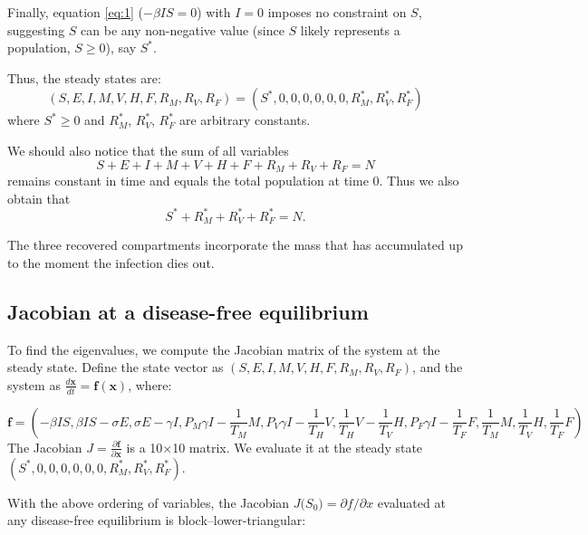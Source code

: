 \documentclass[11pt]{article}
\begin{document}
Finally, equation \ref{eq:1} ($-\beta I S = 0$) with $I = 0$ imposes no constraint on $S$, suggesting $S$ can be any non-negative value (since $S$ likely represents a population, $S \geq 0$), say $S^*$.

Thus, the steady states are:
$$(S, E, I, M, V, H, F, R_M, R_V, R_F) = (S^*, 0, 0, 0, 0, 0, 0, R_M^*, R_V^*, R_F^*)$$
where $S^* \geq 0$ and $R_M^*$, $R_V^*$, $R_F^*$ are arbitrary constants. 

We should also notice that the sum of all variables
\begin{equation}\label{e:param1}
S+E+I+M+V+H+F+R_M+R_V+R_F=N
\end{equation}
remains constant in time and equals the total population at time $0$.  Thus we also obtain that 
\[
S^*+R_M^*+R_V^*+R_F^*=N.
\]

The three recovered compartments incorporate the mass that has accumulated up to the moment the infection dies out.

\subsection{Jacobian at a disease-free equilibrium}

To find the eigenvalues, we compute the Jacobian matrix of the system at the steady state. Define the state vector as $(S, E, I, M, V, H, F, R_M, R_V, R_F)$, and the system as $\frac{d\mathbf{x}}{dt} = \mathbf{f}(\mathbf{x})$, where:

$$\mathbf{f} = \left( -\beta I S, \beta I S - \sigma E, \sigma E - \gamma I, P_M \gamma I - \frac{1}{T_M} M, P_V \gamma I - \frac{1}{T_H} V, \frac{1}{T_H} V - \frac{1}{T_V} H, P_F \gamma I - \frac{1}{T_F} F, \frac{1}{T_M} M, \frac{1}{T_V} H, \frac{1}{T_F} F \right)$$
The Jacobian $J = \frac{\partial \mathbf{f}}{\partial \mathbf{x}}$ is a 10×10 matrix. We evaluate it at the steady state $(S^*, 0, 0, 0, 0, 0, 0, R_M^*, R_V^*, R_F^*)$.

With the above ordering of variables, the Jacobian \(J\bigl(S_0\bigr)=\partial f/\partial x\) evaluated at any disease-free equilibrium is block--lower-triangular:
\end{document}
